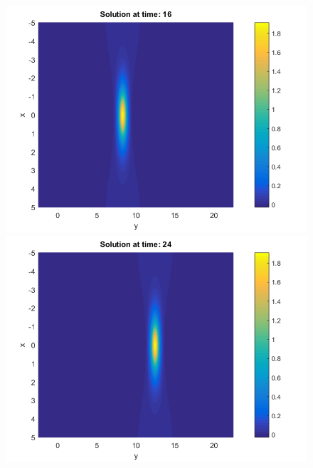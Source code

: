 \documentclass[11pt,a4paper,twoside]{article}
\begin{document}
\begin{figure}[!htbp]
\begin{minipage}[b]{0.31\linewidth}
	\end{minipage}	
	\begin{minipage}[b]{0.31\linewidth}
		 \includegraphics[width=\linewidth]{Pictures/Solution_bt3_t=16.png}
	\end{minipage}
	\begin{minipage}[b]{0.31\linewidth}
		\includegraphics[width=\linewidth]{Pictures/Solution_bt3_t=24.png}
	\end{minipage}	
	\begin{minipage}[b]{0.31\linewidth}

\end{minipage}
\end{figure}
\end{document}
